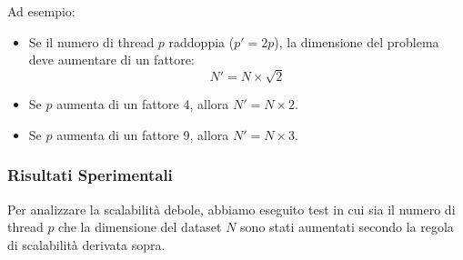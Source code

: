 \documentclass[letterpaper,11pt,leqno]{article}
\begin{document}
Ad esempio:
\begin{itemize}
    \item Se il numero di thread \( p \) raddoppia (\( p' = 2p \)), la dimensione del problema deve aumentare di un fattore:
    \[
    N' = N \times \sqrt{2}
    \]
    \item Se \( p \) aumenta di un fattore 4, allora \( N' = N \times 2 \).
    \item Se \( p \) aumenta di un fattore 9, allora \( N' = N \times 3 \).
\end{itemize}

\subsubsection{Risultati Sperimentali}
Per analizzare la scalabilità debole, abbiamo eseguito test in cui sia il numero di thread \( p \) che la dimensione del dataset \( N \) sono stati aumentati secondo la regola di scalabilità derivata sopra.
\end{document}
